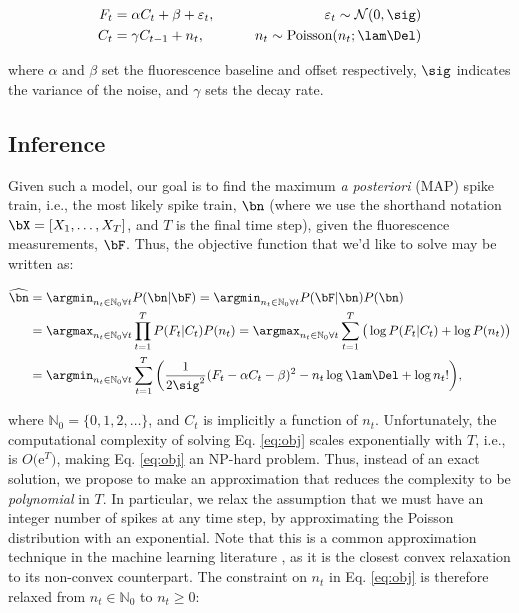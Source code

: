 \begin{align}
F_t &= \alpha C_t + \beta +  \varepsilon_t, \qquad &\varepsilon_t \sim \mathcal{N}(0,\sig) \label{eq:obs} \\
C_t  &= \gamma  C_{t-1} + n_t,  \qquad &n_t \sim \text{Poisson}(n_t; \lam \Del) \label{eq:trans}  
\end{align}

\noindent where $\alpha$ and $\beta$ set the fluorescence baseline and offset respectively, $\sig$ indicates the variance of the noise, and $\gamma$ sets the decay rate. %

\subsection{Inference} \label{sec:inf}

Given such a model, our goal is to find the maximum \emph{a posteriori} (MAP) spike train, i.e., the most likely spike train, $\bn$ (where we use the shorthand notation $\bX=[X_1, \ldots, X_T]$, and $T$ is the final time step),  given the fluorescence measurements, $\bF$. %
Thus, the objective function that we'd like to solve may be written as:

\begin{align}
\hnm &=  \ann P(\bn | \bF) = \ann P(\bF | \bn) P(\bn) \nonumber  \\
&= \argmax_{n_t \in \mathbb{N}_0 \forall t} \prod_{t=1}^T  P(F_t | C_t)  P(n_t) = \argmax_{n_t \in \mathbb{N}_0 \forall t} \sum_{t=1}^T \big( \log P(F_t | C_t) + \log P(n_t)\big)  \nonumber \\
&= \ann  \sum_{t=1}^T \bigg( \frac{1}{2 \sig^2}(F_t - \alpha C_t - \beta)^2  -  n_t \log \lam \Del + \log n_t! \bigg),   \label{eq:obj}
\end{align}

\noindent where $\mathbb{N}_0 = \{0, 1, 2, \ldots\}$, and $C_t$ is implicitly a function of $n_t$.  Unfortunately, the computational complexity of solving Eq. \eqref{eq:obj} scales exponentially with $T$, i.e., is $O($e$^T)$, making Eq. \eqref{eq:obj} an NP-hard problem.  Thus, instead of an exact solution, we propose to make an approximation that reduces the complexity to be \emph{polynomial} in $T$.  In particular, we relax the assumption that we must have an integer number of spikes at any time step, by approximating the Poisson distribution with an exponential.  Note that this is a common approximation technique in the machine learning literature \cite{HastieFriedman01}, as it is the closest convex relaxation to its non-convex counterpart.  The constraint on $n_t$ in Eq. \eqref{eq:obj} is therefore relaxed from  $n_t \in \mathbb{N}_0$ to $n_t \geq 0$:

